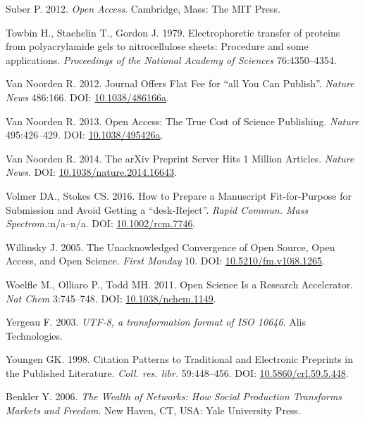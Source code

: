 \documentclass[10pt,fleqn]{wlpeerj}
\begin{document}
\hypertarget{ref-suberux5fopenux5f2012}{}
Suber P. 2012. \emph{Open Access}. Cambridge, Mass: The MIT Press.

\hypertarget{ref-towbinux5felectrophoreticux5f1979}{}
Towbin H., Staehelin T., Gordon J. 1979. Electrophoretic transfer of
proteins from polyacrylamide gels to nitrocellulose sheets: Procedure
and some applications. \emph{Proceedings of the National Academy of
Sciences} 76:4350--4354.

\hypertarget{ref-vanux5fnoordenux5fjournalux5f2012}{}
Van Noorden R. 2012. Journal Offers Flat Fee for ``all You Can
Publish''. \emph{Nature News} 486:166. DOI:
\href{https://doi.org/10.1038/486166a}{10.1038/486166a}.

\hypertarget{ref-vanux5fnoordenux5fopenux5f2013}{}
Van Noorden R. 2013. Open Access: The True Cost of Science Publishing.
\emph{Nature} 495:426--429. DOI:
\href{https://doi.org/10.1038/495426a}{10.1038/495426a}.

\hypertarget{ref-vanux5fnoordenux5farxivux5f2014}{}
Van Noorden R. 2014. The arXiv Preprint Server Hits 1 Million Articles.
\emph{Nature News}. DOI:
\href{https://doi.org/10.1038/nature.2014.16643}{10.1038/nature.2014.16643}.

\hypertarget{ref-volmerux5fhowux5f2016}{}
Volmer DA., Stokes CS. 2016. How to Prepare a Manuscript Fit-for-Purpose
for Submission and Avoid Getting a ``desk-Reject''. \emph{Rapid Commun.
Mass Spectrom.}:n/a--n/a. DOI:
\href{https://doi.org/10.1002/rcm.7746}{10.1002/rcm.7746}.

\hypertarget{ref-willinskyux5funacknowledgedux5f2005}{}
Willinsky J. 2005. The Unacknowledged Convergence of Open Source, Open
Access, and Open Science. \emph{First Monday} 10. DOI:
\href{https://doi.org/10.5210/fm.v10i8.1265}{10.5210/fm.v10i8.1265}.

\hypertarget{ref-woelfleux5fopenux5f2011}{}
Woelfle M., Olliaro P., Todd MH. 2011. Open Science Is a Research
Accelerator. \emph{Nat Chem} 3:745--748. DOI:
\href{https://doi.org/10.1038/nchem.1149}{10.1038/nchem.1149}.

\hypertarget{ref-rfc3629}{}
Yergeau F. 2003. \emph{UTF-8, a transformation format of ISO 10646}.
Alis Technologies.

\hypertarget{ref-youngenux5fcitationux5f1998}{}
Youngen GK. 1998. Citation Patterns to Traditional and Electronic
Preprints in the Published Literature. \emph{Coll. res. libr.}
59:448--456. DOI:
\href{https://doi.org/10.5860/crl.59.5.448}{10.5860/crl.59.5.448}.

\hypertarget{ref-benklerux5fwealthux5f2006}{}
Benkler Y. 2006. \emph{The Wealth of Networks: How Social Production
Transforms Markets and Freedom}. New Haven, CT, USA: Yale University
Press.
\end{document}
